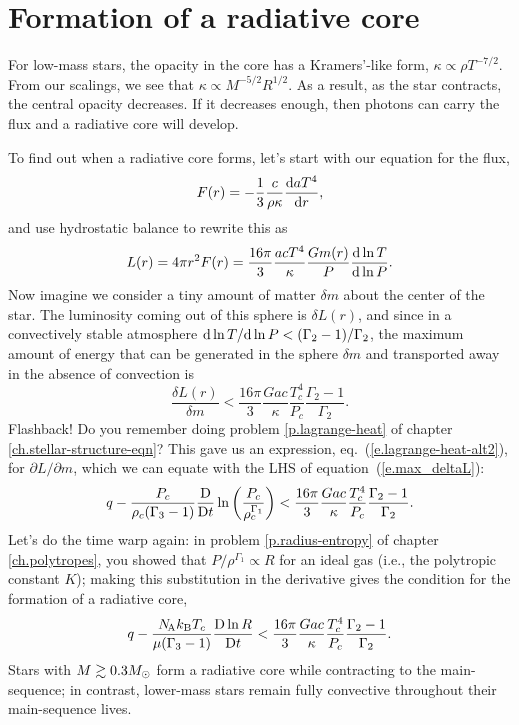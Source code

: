 \section{Formation of a radiative core}

For low-mass stars, the opacity in the core has a Kramers'-like form, $\kappa \propto \rho T^{-7/2}$. From our scalings, we see that $\kappa \propto M^{-5/2} R^{1/2}$.  As a result, as the star contracts, the central opacity decreases.  If it decreases enough, then photons can carry the flux and a radiative core will develop.

To find out when a radiative core forms, let's start with our equation for the flux,
\[ F(r) = -\frac{1}{3}\frac{c}{\rho\kappa}\frac{\mathrm{d} aT^{4}}{\mathrm{d} r}, \]
and use hydrostatic balance to rewrite this as
\[ L(r) = 4\pi r^{2}F(r) = \frac{16\pi}{3}  \frac{acT^{4}}{\kappa} \frac{Gm(r)}{P} \frac{\mathrm{d} \ln T}{\mathrm{d} \ln P}. \]
Now imagine we consider a tiny amount of matter $\delta m$ about the center of the star.  The luminosity coming out of this sphere is $\delta L(r)$,  and since in a convectively stable atmosphere $\mathrm{d}\ln T/\mathrm{d}\ln P < (\Gamma_{2}-1)/\Gamma_{2}$, the maximum amount of energy that can be generated in the sphere $\delta m$ and transported away in the absence of convection is
\begin{equation}\label{e.max_deltaL}
  \frac{\delta L(r)}{\delta m} < \frac{16\pi}{3} \frac{Gac}{\kappa} \frac{T_{c}^{4}}{P_{c}}  \frac{\Gamma_{2}-1}{\Gamma_{2}}. 
\end{equation}
Flashback! Do you remember doing problem \ref{p.lagrange-heat} of chapter \ref{ch.stellar-structure-eqn}? This gave us an expression, eq.~(\ref{e.lagrange-heat-alt2}), for $\partial L/\partial m$, which we can equate with the LHS of equation~(\ref{e.max_deltaL}):
\[
 q - \frac{P_{c}}{\rho_{c}(\Gamma_{3}-1)}\frac{\mathrm{D} }{\mathrm{D} t}\ln\left(\frac{P_{c}}{\rho_{c}^{\Gamma_{1}}}\right) <
 	\frac{16\pi}{3} \frac{Gac}{\kappa} \frac{T_{c}^{4}}{P_{c}}  \frac{\Gamma_{2}-1}{\Gamma_{2}}.
\]
Let's do the time warp again: in problem \ref{p.radius-entropy} of chapter \ref{ch.polytropes}, you showed that $P/\rho^{\Gamma_{1}} \propto R$ for an ideal gas (i.e., the polytropic constant $K$); making this substitution in the derivative gives the condition for the formation of a radiative core,
\begin{equation}\label{e.formation-radiative-core}
q - \frac{N_\mathrm{\!A}k_\mathrm{B} T_{c}}{\mu(\Gamma_{3}-1)} \frac{\mathrm{D} \ln R}{\mathrm{D} t} < \frac{16\pi}{3} \frac{Gac}{\kappa} \frac{T_{c}^{4}}{P_{c}}  \frac{\Gamma_{2}-1}{\Gamma_{2}}.
\end{equation}
Stars with $M \gtrsim 0.3 M_\odot$ form a radiative core while contracting to the main-sequence; in contrast, lower-mass stars remain fully convective throughout their main-sequence lives.

